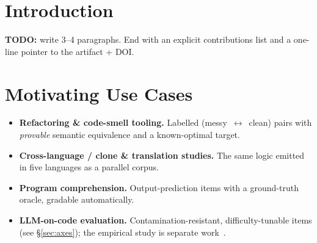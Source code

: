 \documentclass[sigconf,nonacm=false]{acmart}
\begin{document}
\section{Introduction}
\label{sec:intro}
\textbf{TODO:} write 3--4 paragraphs. End with an explicit contributions list and a
one-line pointer to the artifact + DOI.

\section{Motivating Use Cases}
\label{sec:usecases}
\begin{itemize}
  \item \textbf{Refactoring \& code-smell tooling.} Labelled (messy~$\leftrightarrow$~clean)
        pairs with \emph{provable} semantic equivalence and a known-optimal target.
  \item \textbf{Cross-language / clone \& translation studies.} The same logic
        emitted in five languages as a parallel corpus.
  \item \textbf{Program comprehension.} Output-prediction items with a ground-truth
        oracle, gradable automatically.
  \item \textbf{LLM-on-code evaluation.} Contamination-resistant, difficulty-tunable
        items (see \S\ref{sec:axes}); the empirical study is separate
        work~\cite{TODO-companion-study}.
\end{itemize}
\end{document}
